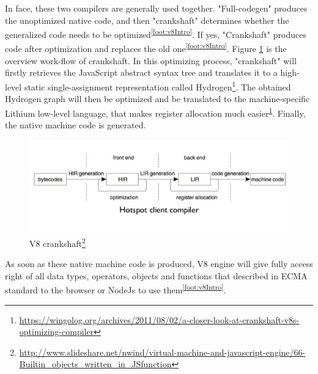     In face, these two compilers are generally used together. "Full-codegen" produces the unoptimized native code, and then "crankshaft" determines whether the generalized code needs to be optimized\textsuperscript{\ref{foot:v8Intro}}. If yes, "Crankshaft" produces code after optimization and replaces the old one\textsuperscript{\ref{foot:v8Intro}}. Figure \ref{fig:crankshaft} is the overview work-flow of crankshaft. In this optimizing process, "crankshaft" will firstly retrieves the JavaScript abstract syntax tree and translates it to a high-level static single-assignment representation called Hydrogen\footnote{\label{foot:wingolog}\url{https://wingolog.org/archives/2011/08/02/a-closer-look-at-crankshaft-v8s-optimizing-compiler}}. The obtained Hydrogen graph will then be optimized and be translated to the machine-specific Lithium low-level language, that makes register allocation much easier\textsuperscript{\ref{foot:wingolog}}. Finally, the native machine code is generated.
        
         \begin{figure}[H]
            \centering
            \includegraphics[scale = 0.4]
            {Images/concepts/crankshaft.png}
            \caption[crankshaft]%
            {V8 crankshaft\footnote{\url{http://www.slideshare.net/nwind/virtual-machine-and-javascript-engine/66-Builtin_objects_written_in_JSfunction}}}  
            \label{fig:crankshaft}
        \end{figure}
        
     As soon as these native machine code is produced, V8 engine will give fully access right of all data types, operators, objects and functions that described in ECMA standard to the browser or NodeJs to use them\textsuperscript{\ref{foot:v8Intro}}.   
     
